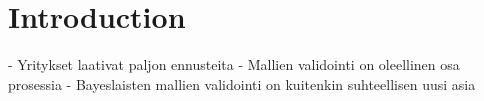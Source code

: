 \documentclass[english, 12pt, a4paper, sci, utf8, a-1b, online]{aaltothesis}
\begin{document}
\cleardoublepage

\section{Introduction}









- Yritykset laativat paljon ennusteita
- Mallien validointi on oleellinen osa prosessia
- Bayeslaisten mallien validointi on kuitenkin suhteellisen uusi asia
\end{document}
